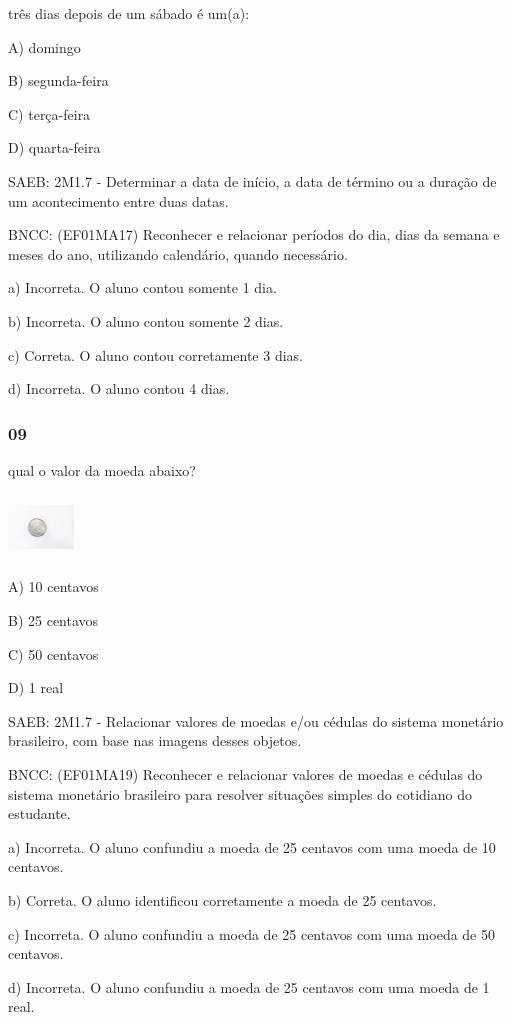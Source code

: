 três dias depois de um sábado é um(a):

A) domingo

B) segunda-feira

C) terça-feira

D) quarta-feira

SAEB: 2M1.7 - Determinar a data de início, a data de término ou a
duração de um acontecimento entre duas datas.

BNCC: (EF01MA17) Reconhecer e relacionar períodos do dia, dias da semana
e meses do ano, utilizando calendário, quando necessário.

a) Incorreta. O aluno contou somente 1 dia.

b) Incorreta. O aluno contou somente 2 dias.

c) Correta. O aluno contou corretamente 3 dias.

d) Incorreta. O aluno contou 4 dias.

\subsubsection{09}\label{section-125}

qual o valor da moeda abaixo?

\includegraphics[width=0.69044in,height=0.66964in]{media/image64.jpg}

A) 10 centavos

B) 25 centavos

C) 50 centavos

D) 1 real

SAEB: 2M1.7 - Relacionar valores de moedas e/ou cédulas do sistema
monetário brasileiro, com base nas imagens desses objetos.

BNCC: (EF01MA19) Reconhecer e relacionar valores de moedas e cédulas do
sistema monetário brasileiro para resolver situações simples do
cotidiano do estudante.

a) Incorreta. O aluno confundiu a moeda de 25 centavos com uma moeda de
10 centavos.

b) Correta. O aluno identificou corretamente a moeda de 25 centavos.

c) Incorreta. O aluno confundiu a moeda de 25 centavos com uma moeda de
50 centavos.

d) Incorreta. O aluno confundiu a moeda de 25 centavos com uma moeda de
1 real.

